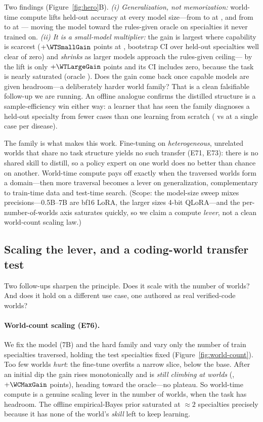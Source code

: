 \documentclass[11pt]{article}
\begin{document}
Two findings (Figure~\ref{fig:hero}B). \emph{(i) Generalization, not memorization:}
world-time compute lifts held-out accuracy at every model size---from \WTSmallBase{} to
\WTSmallFT{} at \WTSmallName{}, and from \WTLargeBase{} to \WTLargeFT{} at \WTLargeName{}---%
moving the model toward the rules-given oracle on specialties it never trained on.
\emph{(ii) It is a small-model multiplier:} the gain is largest where capability is
scarcest ($+\WTSmallGain$ points at \WTSmallName, bootstrap CI over held-out specialties
well clear of zero) and \emph{shrinks} as larger models approach the rules-given ceiling---%
by \WTLargeName{} the lift is only $+\WTLargeGain$ points and its CI includes zero, because
the task is nearly saturated (oracle \WTOracle). Does the gain come back once capable
models are given headroom---a deliberately harder world family? That is a clean falsifiable
follow-up we are running. An offline analogue confirms the distilled structure is a
sample-efficiency win either way: a learner that has seen the family diagnoses a held-out
specialty from fewer cases than one learning from scratch (\WTMetaFewShot{} vs
\WTScratchFewShot{} at a single case per disease).

The family is what makes this work. Fine-tuning on \emph{heterogeneous}, unrelated
worlds that share no task structure yields no such transfer (E71, E73): there is no shared
skill to distill, so a policy expert on one world does no better than chance on another.
World-time compute pays off exactly when the traversed worlds form a domain---then more
traversal becomes a lever on generalization, complementary to train-time data and test-time
search. (Scope: the model-size sweep mixes precisions---0.5B--7B are bf16 LoRA, the larger
sizes 4-bit QLoRA---and the per-number-of-worlds axis saturates quickly, so we claim a
compute \emph{lever}, not a clean world-count scaling law.)

\subsection{Scaling the lever, and a coding-world transfer test}\label{sec:world-time-scale}
Two follow-ups sharpen the principle. Does it scale with the number of worlds? And
does it hold on a different use case, one authored as real verified-code worlds?

\paragraph{World-count scaling (E76).} We fix the model (7B) and the hard family and vary
only the number of train specialties traversed, holding the test specialties fixed
(Figure~\ref{fig:world-count}). Too few worlds \emph{hurt}: the fine-tune overfits a narrow
slice, below the \WCBase{} base. After an initial dip the gain rises monotonically and is \emph{still
climbing at \WCMaxWorlds{} worlds} (\WCMaxAcc, $+\WCMaxGain$ points), heading toward the
\WCOracle{} oracle---no plateau. So world-time compute is a genuine scaling lever in the
number of worlds, when the task has headroom. The offline empirical-Bayes prior saturated at
${\approx}2$ specialties precisely because it has none of the world's \emph{skill} left to keep
learning.
\end{document}
